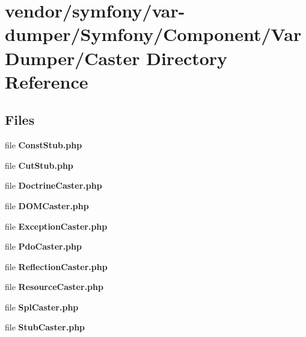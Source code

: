 \section{vendor/symfony/var-\/dumper/\+Symfony/\+Component/\+Var\+Dumper/\+Caster Directory Reference}
\label{dir_b25915683cbd3a0175b749c5f6d5797a}
\subsection*{Files}
\begin{DoxyCompactItemize}
\item 
file {\bf Const\+Stub.\+php}
\item 
file {\bf Cut\+Stub.\+php}
\item 
file {\bf Doctrine\+Caster.\+php}
\item 
file {\bf D\+O\+M\+Caster.\+php}
\item 
file {\bf Exception\+Caster.\+php}
\item 
file {\bf Pdo\+Caster.\+php}
\item 
file {\bf Reflection\+Caster.\+php}
\item 
file {\bf Resource\+Caster.\+php}
\item 
file {\bf Spl\+Caster.\+php}
\item 
file {\bf Stub\+Caster.\+php}
\end{DoxyCompactItemize}
